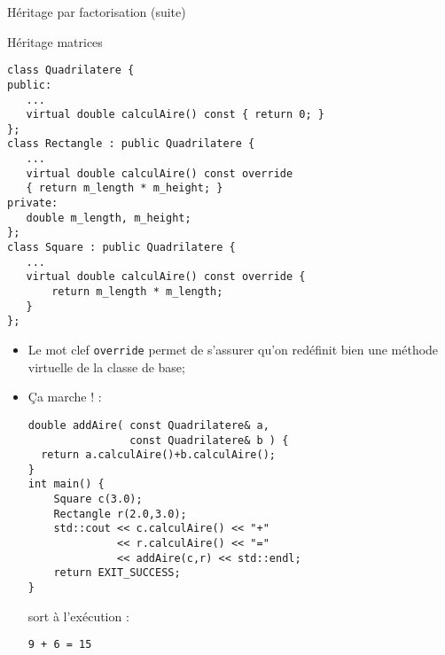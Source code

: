\documentclass[handout,10pt]{beamer}
\begin{document}
\begin{frame}[fragile]{Héritage par factorisation (suite)}
\tiny
\begin{exampleblock}{Héritage matrices}
\begin{minipage}{0.48\textwidth}
\begin{lstlisting}
class Quadrilatere {
public:
   ...
   virtual double calculAire() const { return 0; }
};
class Rectangle : public Quadrilatere {
   ...
   virtual double calculAire() const override
   { return m_length * m_height; }
private:
   double m_length, m_height;
};
class Square : public Quadrilatere {
   ...
   virtual double calculAire() const override {
       return m_length * m_length;
   }
};\end{lstlisting}
\end{minipage}\hfill
\begin{minipage}{0.48\textwidth}
\begin{itemize}
\item Le mot clef \lstinline$override$ permet de s'assurer qu'on redéfinit bien une méthode virtuelle de la classe de base;
\item Ça marche ! :
\begin{lstlisting}
double addAire( const Quadrilatere& a, 
                const Quadrilatere& b ) {
  return a.calculAire()+b.calculAire();
}
int main() {
    Square c(3.0);
    Rectangle r(2.0,3.0);
    std::cout << c.calculAire() << "+" 
              << r.calculAire() << "="
              << addAire(c,r) << std::endl;
    return EXIT_SUCCESS;
}
\end{lstlisting}
sort à l'exécution :
\begin{lstlisting}
9 + 6 = 15
\end{lstlisting}
\end{itemize}
\end{minipage}
\end{exampleblock}
\end{frame}
\end{document}
